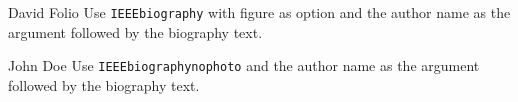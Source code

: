 \documentclass[
  journal,
]{IEEEtran}%
\theoremstyle{plain}
\theoremstyle{remark}
\providecommand{\bibfont}{\footnotesize}
\begin{document}

\pagebreak[3]
\begin{IEEEbiography}{David Folio}
Use \texttt{IEEEbiography} with figure as option and the author name as
the argument followed by the biography text.
\end{IEEEbiography}
\begin{IEEEbiographynophoto}{John Doe}
Use \texttt{IEEEbiographynophoto} and the author name as the argument
followed by the biography text.
\end{IEEEbiographynophoto}
\end{document}
